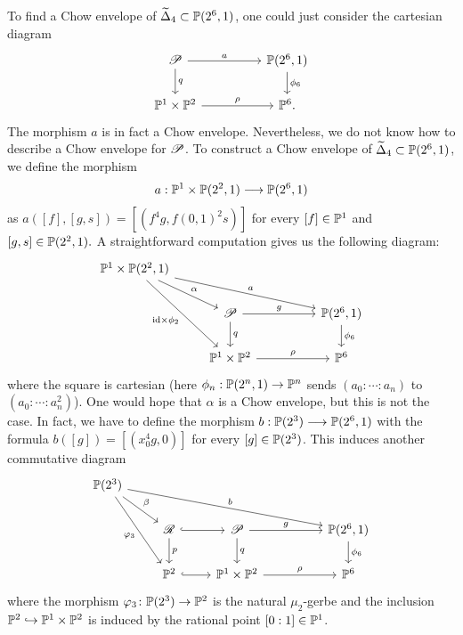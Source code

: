 \documentclass[a4paper, 10pt]{amsart}
\numberwithin{equation}{section}
\numberwithin{subsection}{section}
\theoremstyle{definition}
\theoremstyle{remark}
\newcommand\id{\mathrm{id}}
\begin{document}
	To find a Chow envelope of $\widetilde{\Delta}_4\subset \mathbb{P}(2^6,1)$, one could just consider the cartesian diagram
	$$
	\begin{tikzcd}
		\cP \arrow[rr, "a"] \arrow[d, "q"]    &  & {\PP(2^6,1)} \arrow[d, "\phi_6"] \\
		\PP^1 \times \PP^2 \arrow[rr, "\rho"] &  & \PP^6.                        
	\end{tikzcd}
	$$
	The morphism $a$ is in fact a Chow envelope. Nevertheless, we do not know how to describe a Chow envelope for $\mathscr{P}$. To construct a Chow envelope of $\widetilde{\Delta}_4 \subset \mathbb{P}(2^6,1)$, we define the morphism 
	$$ a: \mathbb{P}^1 \times \mathbb{P}(2^2,1) \longrightarrow \mathbb{P}(2^6,1)$$
	as $a([f],[g,s])=[(f^4g,f(0,1)^2s)]$ for every $[f]\in \mathbb{P}^1$ and $[g,s] \in \mathbb{P}(2^2,1).$
	A straightforward computation gives us the following diagram:
	$$
	\begin{tikzcd}
		{\PP^1 \times \PP(2^2,1)} \arrow[rd, "\alpha"] \arrow[rdd, "\id \times \phi_2"'] \arrow[rrrd, "a"] &                                       &  &                               \\
		& \cP \arrow[rr, "g"] \arrow[d, "q"]    &  & {\PP(2^6,1)} \arrow[d, "\phi_6"] \\
		& \PP^1 \times \PP^2 \arrow[rr, "\rho"] &  & \PP^6                        
	\end{tikzcd}
	$$
	where the square is cartesian (here $\phi_n: \mathbb{P}(2^n,1)\rightarrow \mathbb{P}^n$ sends $(a_0:\cdots:a_n)$ to $(a_0:\cdots:a_n^2)$). One would hope that $\alpha$ is a Chow envelope, but this is not the case. In fact, we have to define the morphism 
	$b: \mathbb{P}(2^3) \longrightarrow \mathbb{P}(2^6,1)$
	with the formula $b([g])=[(x_0^4g,0)]$ for every $[g]\in \mathbb{P}(2^3)$. This induces another commutative diagram 
	$$
	\begin{tikzcd}
		\PP(2^3) \arrow[rrrrd, "b"] \arrow[rdd, "\varphi_3"'] \arrow[rd, "\beta"] &                                    &                                       &  &                               \\
		& \cR \arrow[d, "p"] \arrow[r, hook] & \cP \arrow[rr, "g"] \arrow[d, "q"]    &  & {\PP(2^6,1)} \arrow[d, "\phi_6"] \\
		& \PP^2 \arrow[r, hook]              & \PP^1 \times \PP^2 \arrow[rr, "\rho"] &  & \PP^6                        
	\end{tikzcd}
	$$ 
	where the morphism $\varphi_3\colon\mathbb{P}(2^3)\rightarrow \mathbb{P}^2$ is the natural $\mu_2$-gerbe and the inclusion $\mathbb{P}^2 \hookrightarrow \mathbb{P}^1 \times \mathbb{P}^2$ is induced by the rational point $[0:1] \in \mathbb{P}^1$.
	
\end{document}
